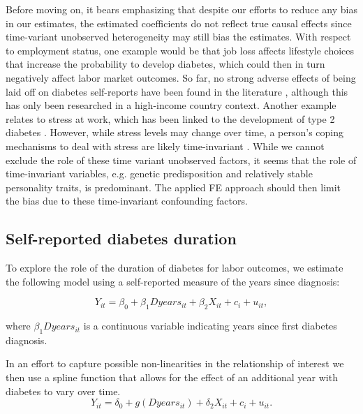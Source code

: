 \documentclass[12pt,english]{article}
\begin{document}
{Before moving on, it bears emphasizing that despite our efforts to reduce any bias in our estimates, the estimated coefficients do not reflect true causal effects since time-variant unobserved heterogeneity may still bias the estimates. With respect to employment status, one example would be that job loss affects lifestyle choices that increase the probability to develop diabetes, which could then in turn negatively affect labor market outcomes. So far, no strong adverse effects of being laid off on diabetes self-reports have been found in the literature \parencite{Bergemann2011,Schaller2015}, although this has only been researched in a high-income country context. Another example relates to stress at work, which has been linked to the development of type 2 diabetes \parencite{Heraclides2012,Eriksson2013}. However, while stress levels may change over time, a person's coping mechanisms to deal with stress are likely time-invariant \textcite{Schneiderman2005}. While we cannot exclude the role of these time variant unobserved factors, it seems that the role of time-invariant variables, e.g. genetic predisposition and relatively stable personality traits, is predominant. The applied \ac{FE} approach should then limit the bias due to these time-invariant confounding factors. 


\subsection{Self-reported diabetes duration}
To explore the role of the duration of diabetes for labor outcomes, we estimate the following model using a self-reported
measure of the years since diagnosis:


\begin{equation}
Y_{it}=\beta_{0}+\beta_{1}Dyears_{it}+\beta_{2}X_{it}+c_{i}+u_{it},\label{eq:duration_linear}
\end{equation}


\noindent where $\beta_{1}Dyears_{it}$ is a continuous variable indicating years since first diabetes diagnosis.

In an effort to capture possible non-linearities in the relationship of interest we then use a spline function that allows for the effect of an additional year with diabetes to vary over time.
\begin{equation}
Y_{it}=\delta_{0}+g(Dyears_{it})+\delta_{2}X_{it}+c_{i}+u_{it}.\label{eq:splines}
\end{equation}


}
\end{document}
